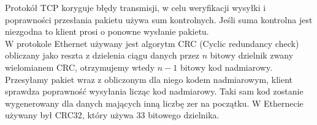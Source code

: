 Protokół TCP koryguje błędy transmisji, w celu weryfikacji wysyłki i poprawności przesłania pakietu używa sum kontrolnych. Jeśli suma kontrolna jest niezgodna to klient prosi o ponowne wysłanie pakietu.\\
W protokole Ethernet używany jest algorytm CRC (Cyclic redundancy check) obliczany jako reszta z dzielenia ciągu danych przez $n$ bitowy dzielnik zwany wielomianem CRC, otrzymujemy wtedy $n-1$ bitowy kod nadmiarowy. Przesyłamy pakiet wraz z obliczonym dla niego kodem nadmiarowym, klient sprawdza poprawność wysyłania licząc kod nadmiarowy.
Taki sam kod zostanie wygenerowany dla danych mających inną liczbę zer na początku. W Ethernecie używany był CRC32, który używa 33 bitowego dzielnika.

